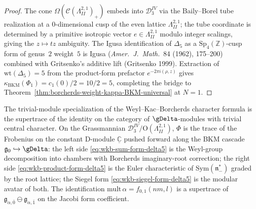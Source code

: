 \begin{proof}
The cone $\Omega(\mathcal{C}(\Lambda^{2,1}_{II})_+)$ embeds into
$\mathcal{D}^{IV}_3$ via the Baily--Borel tube realization at a
$0$-dimensional cusp of the even lattice $\Lambda^{2,1}_{II}$; the
tube coordinate is determined by a primitive isotropic vector
$e \in \Lambda^{2,1}_{II}$ modulo integer scalings, giving the
$z \mapsto t z$ ambiguity. The Igusa identification of $\Delta_5$ as
a $\mathrm{Sp}_4(\mathbb{Z})$-cusp form of genus~$2$ weight~$5$ is
Igusa (\emph{Amer.\ J.\ Math.}~84 (1962), 175--200) combined with
Gritsenko's additive lift (Gritsenko 1999). Extraction of
$\mathrm{wt}(\Delta_5) = 5$ from the product-form prefactor
$e^{-2\pi i(\rho,z)}$ gives
$\kappa_{\mathrm{BKM}}(\Phi_1) = c_1(0)/2 = 10/2 = 5$,
completing the bridge to
Theorem~\ref{thm:borcherds-weight-kappa-BKM-universal} at $N = 1$.
\end{proof}

\begin{remark}
\label{rem:denominator-identity-d-module}
The trivial-module specialization of the Weyl--Kac--Borcherds
character formula is the supertrace of the identity on the category
of $\gDelta$-modules with trivial central character. On the
Grassmannian $\mathcal{D}^{IV}_3/\mathrm{O}(\Lambda^{2,1}_{II})$,
$\Phi$ is the trace of the Frobenius on the constant D-module
$\underline{\mathbb{C}}$ pushed forward along the BKM
cascade $\mathfrak{g}_0 \hookrightarrow \gDelta$: the left side
\eqref{eq:wkb-sum-form-delta5} is the Weyl-group decomposition
into chambers with Borcherds imaginary-root correction; the right
side \eqref{eq:wkb-product-form-delta5} is the Euler
characteristic of $\mathrm{Sym}(\mathfrak{n}_-^*)$ graded by the
root lattice; the Siegel form \eqref{eq:wkb-siegel-form-delta5}
is the modular avatar of both. The identification
$\mathrm{mult}\,\alpha = f_{0,1}(nm, l)$ is a supertrace of
$\mathfrak{g}_{\alpha,\bar 0} \ominus \mathfrak{g}_{\alpha,\bar 1}$
on the Jacobi form coefficient.
\end{remark}


